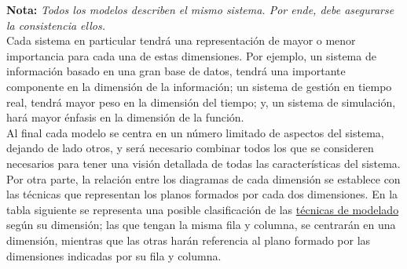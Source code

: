 \textbf{Nota:} \textit{Todos los modelos describen el mismo sistema. Por ende, debe asegurarse la consistencia ellos.}\\

Cada sistema en particular tendrá una representación de mayor o menor importancia para cada una de estas dimensiones. Por ejemplo, un sistema de información basado en una gran base de datos, tendrá una importante componente en la dimensión de la información; un sistema de gestión en tiempo real, tendrá mayor peso en la dimensión del tiempo; y, un sistema de simulación, hará mayor énfasis en la dimensión de la función.\\

Al final cada modelo se centra en un número limitado de aspectos del sistema, dejando de lado otros, y será necesario combinar todos los que se consideren necesarios para tener una visión detallada de todas las características del sistema.\\

Por otra parte, la relación entre los diagramas de cada dimensión se establece con las técnicas que representan los planos formados por cada dos dimensiones. En la tabla siguiente se representa una posible clasificación de las \uline{técnicas de modelado} según su dimensión; las que tengan la misma fila y columna, se centrarán en una dimensión, mientras que las otras harán referencia al plano formado por las dimensiones indicadas por su fila y columna.

